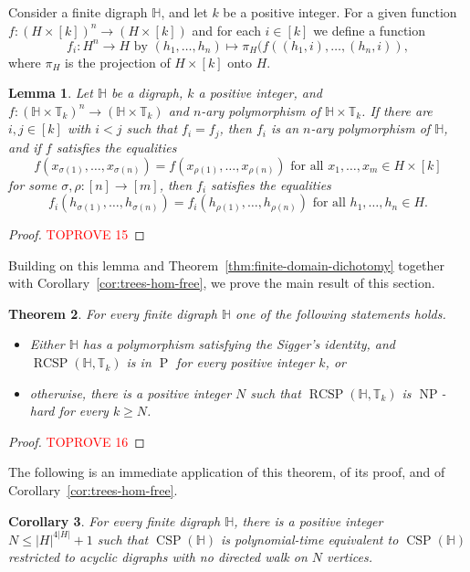 \documentclass{article}
\newtheorem{theorem}{Theorem}
\newtheorem{lemma}[theorem]{Lemma}
\newtheorem{corollary}[theorem]{Corollary}
\theoremstyle{definition}
\theoremstyle{remark}
\DeclareMathOperator{\NP}{NP}
\DeclareMathOperator{\cP}{P}
\DeclareMathOperator{\CSP}{CSP}
\DeclareMathOperator{\RCSP}{RCSP}
\newcommand{\bH}{{\mathbb H}}
\newcommand{\bT}{{\mathbb T}}
\begin{document}
Consider a finite digraph $\bH$, and let $k$ be a positive integer. For a given function 
$f\colon (H\times [k])^n\to (H\times [k])$ and for each $i\in [k]$ we define a function
\[
f_i\colon H^n\to H \text{ by } (h_1,\dots, h_n)\mapsto \pi_H(f((h_1,i),\dots, (h_n,i)),
\]
where $\pi_H$ is the projection of $H\times [k]$ onto $H$.

\begin{lemma}\label{lem:HxTk-loop-condition}
    Let $\bH$ be a digraph, $k$ a positive integer, and $f\colon (\bH\times \bT_k)^n\to (\bH\times \bT_k)$
    and $n$-ary polymorphism of $\bH\times \bT_k$. If there are $i,j\in [k]$ with $i < j$ such that
    $f_i = f_j$, then $f_i$ is an $n$-ary polymorphism of $\bH$, and if $f$ satisfies the equalities
    \[
        f(x_{\sigma(1)},\dots, x_{\sigma(n)}) = f(x_{\rho(1)},\dots, x_{\rho(n)}) \text{ for all } x_1,\dots, x_m\in H\times [k]
    \]
    for some $\sigma,\rho\colon[n]\to [m]$, then $f_i$ satisfies the equalities  
    \[
    f_i(h_{\sigma(1)},\dots, h_{\sigma(n)}) = f_i(h_{\rho(1)},\dots, h_{\rho(n)}) \text{ for all } h_1,\dots, h_n\in H.
    \]
\end{lemma}
\begin{proof}\textcolor{red}{TOPROVE 15}\end{proof}

Building on this lemma and Theorem~\ref{thm:finite-domain-dichotomy} together with
Corollary~\ref{cor:trees-hom-free}, we prove the main result of this section.

\begin{theorem}\label{thm:RCSP(H,TTk)}
    For every finite digraph $\bH$ one of the following statements holds.
    \begin{itemize}
        \item Either $\bH$ has a polymorphism satisfying the Sigger's identity, and $\RCSP(\bH,\bT_k)$ is in $\cP$ for
        every positive integer $k$, or
        \item otherwise, there is a positive integer $N$ such that  $\RCSP(\bH,\bT_k)$ is $\NP$-hard for every $k\ge N$.
    \end{itemize}
\end{theorem}
\begin{proof}\textcolor{red}{TOPROVE 16}\end{proof}

The following is an immediate application of this theorem, of its proof, and of
Corollary~\ref{cor:trees-hom-free}.

\begin{corollary}\label{cor:CSPH-forbidden-walks}
    For every finite digraph $\bH$, there is a positive integer $N\le |H|^{4|H|}+1$ such that
    $\CSP(\bH)$ is polynomial-time equivalent to $\CSP(\bH)$ restricted to acyclic digraphs with no
    directed walk on $N$ vertices. 
\end{corollary}
\end{document}
